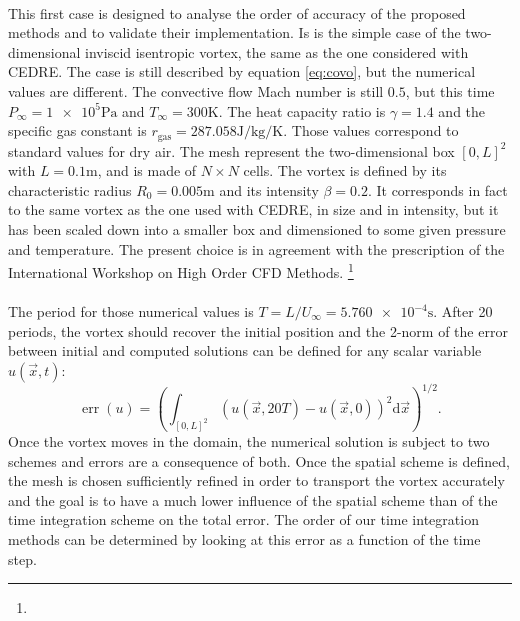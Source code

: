       \paragraph{}
      This first case is designed to analyse the order of accuracy of the proposed methods and to validate their implementation.
      Is is the simple case of the two-dimensional inviscid isentropic vortex, the same as the one considered with CEDRE.
      The case is still described by equation \ref{eq:covo}, but the numerical values are different.
      The convective flow Mach number is still $0.5$, but this time $P_\infty = \num{1e5}\si{\pascal}$ and $T_\infty = 300\si{\kelvin}$.
      The heat capacity ratio is $\gamma = 1.4$ and the specific gas constant is $r_\textrm{gas} = 287.058\si{\joule\per\kilo\gram\per\kelvin}$.
      Those values correspond to standard values for dry air.
      The mesh represent the two-dimensional box $\left[0, L\right]^2$ with $L = 0.1\si{\meter}$, and is made of $N \times N$ cells.
      The vortex is defined by its characteristic radius $R_0 = 0.005\si{\meter}$ and its intensity $\beta = 0.2$.
      It corresponds in fact to the same vortex as the one used with CEDRE, in size and in intensity, but it has been scaled down into a smaller box and dimensioned to some given pressure and temperature.
      The present choice is in agreement with the prescription of the International Workshop on High Order CFD Methods.
      \footnote{}

      \paragraph{}
      The period for those numerical values is $T = L / U_\infty = \num{5.760e-4}\si{\second}$.
      After 20 periods, the vortex should recover the initial position and the 2-norm of the error between initial and computed solutions can be defined for any scalar variable $u\left(\vec{x}, t\right)$:
      \begin{equation}
        \operatorname{err}\left(u\right) = \left(\int_{\left[0, L\right]^2} \left(u\left(\vec{x}, 20T\right) - u\left(\vec{x}, 0\right)\right)^2 \mathrm{d}\vec{x} \right)^{1/2} .
      \end{equation}
      Once the vortex moves in the domain, the numerical solution is subject to two schemes and errors are a consequence of both.
      Once the spatial scheme is defined, the mesh is chosen sufficiently refined in order to transport the vortex accurately and the goal is to have a much lower influence of the spatial scheme than of the time integration scheme on the total error.
      The order of our time integration methods can be determined by looking at this error as a function of the time step.

